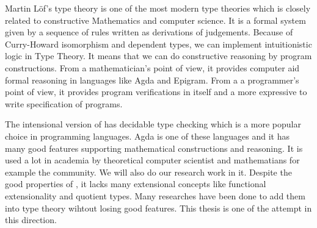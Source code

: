 Martin L\"{o}f's type theory is one of the most modern type theories which is closely related to constructive Mathematics and computer science. It is a formal system given by a sequence of rules written as derivations of judgements. Because of Curry-Howard isomorphism and dependent types, we can implement intuitionistic logic in Type Theory. It means that we can do constructive reasoning by program constructions. From a mathematician's point of view, it provides computer aid formal reasoning in languages like Agda and Epigram. From a a programmer's point of view, it provides program verifications in itself and a more expressive to write specification of programs.

The intensional version of \mltt has decidable type checking which is a more popular choice in programming languages. Agda is one of these languages and it has many good features supporting mathematical constructions and reasoning. It is used a lot in academia by theoretical computer scientist and mathematians for example the \hott community. We will also do our research work in it.
Despite the good properties of \itt, it lacks many extensional concepts like functional extensionality and quotient types. Many researches have been done to add them into type theory wihtout losing good features. This thesis is one of the attempt in this direction.




